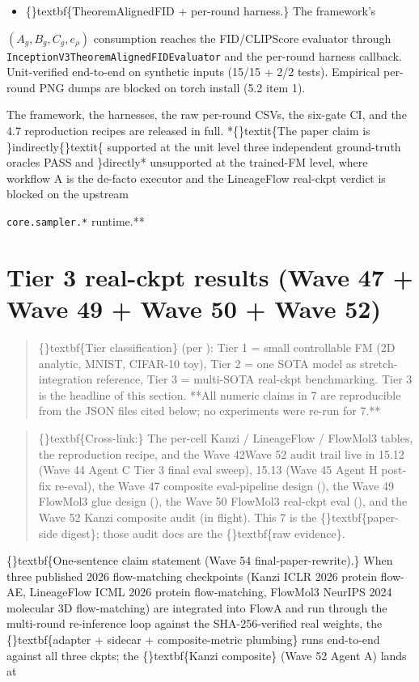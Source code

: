 \documentclass{article}
\begin{document}
\begin{itemize}
\item \{\}textbf\{TheoremAlignedFID + per-round harness.\} The framework's
\end{itemize}
$(A_g, B_g, C_g, e_\rho)$ consumption reaches the FID/CLIPScore evaluator through \texttt{InceptionV3TheoremAlignedFIDEvaluator} and the per-round harness callback. Unit-verified end-to-end on synthetic inputs (15/15 + 2/2 tests). Empirical per-round PNG dumps are blocked on torch install (5.2 item 1).

The framework, the harnesses, the raw per-round CSVs, the six-gate CI, and the 4.7 reproduction recipes are released in full. *\{\}textit\{The paper claim is \}indirectly\{\}textit\{ supported at the unit level  three independent ground-truth oracles PASS  and \}directly* unsupported at the trained-FM level, where workflow A is the de-facto executor and the LineageFlow real-ckpt verdict is blocked on the upstream

\texttt{core.sampler.*} runtime.**

\section{Tier 3 real-ckpt results (Wave 47 + Wave 49 + Wave 50 + Wave 52)}
\begin{quote}
\{\}textbf\{Tier classification\} (per ):
Tier 1 = small controllable FM (2D analytic, MNIST, CIFAR-10 toy),
Tier 2 = one SOTA model as stretch-integration reference, Tier 3 =
multi-SOTA real-ckpt benchmarking. Tier 3 is the headline of this
section. **All numeric claims in 7 are reproducible from the JSON
files cited below; no experiments were re-run for 7.**
\end{quote}
\begin{quote}
\sloppy \{\}textbf\{Cross-link:\} The per-cell Kanzi / LineageFlow / FlowMol3 tables, the
reproduction recipe, and the Wave 42Wave 52 audit trail live in
 15.12 (Wave 44 Agent C Tier 3 final
eval sweep), 15.13 (Wave 45 Agent H post-fix re-eval), the Wave 47
composite eval-pipeline design (),
the Wave 49 FlowMol3 glue design (),
the Wave 50 FlowMol3 real-ckpt eval (),
and the Wave 52 Kanzi composite audit (in flight). This 7 is the
\{\}textbf\{paper-side digest\}; those audit docs are the \{\}textbf\{raw evidence\}.
\end{quote}
\{\}textbf\{One-sentence claim statement (Wave 54 final-paper-rewrite).\} When three published 2026 flow-matching checkpoints (Kanzi ICLR 2026 protein flow-AE, LineageFlow ICML 2026 protein flow-matching, FlowMol3 NeurIPS 2024 molecular 3D flow-matching) are integrated into FlowA and run through the multi-round re-inference loop against the SHA-256-verified real weights, the \{\}textbf\{adapter + sidecar + composite-metric plumbing\} runs end-to-end against all three ckpts; the \{\}textbf\{Kanzi composite\} (Wave 52 Agent A) lands at
\end{document}
